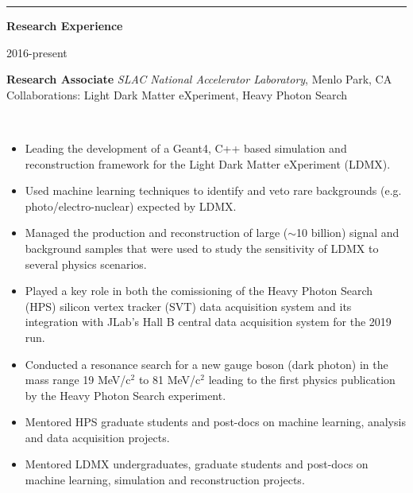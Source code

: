 \documentclass[11pt]{article}
\newcommand{\cvsection}[1] {
    \noindent
    \textcolor{indigodye}{\rule{.15\textwidth}{.1in} \hspace{0.01 \textwidth} \textbf{\Large{#1}}} \newline 
}
\newcommand{\experienceentrycollab}[6] { 
    \noindent
    \begin{minipage}[t]{0.15\textwidth} \begin{flushright} #1 \end{flushright} \end{minipage} \hspace{0.01\textwidth}
    \begin{minipage}[t]{0.84\textwidth} 
        \textbf{#2} \newline
        \emph{#3}, #4 \newline
        Collaborations: #5
    \end{minipage} \\[0.01pt]
    #6 \vspace{11pt}
}
\begin{document}
    \cvsection{Research Experience}
        \experienceentrycollab{2016-present}
                        {Research Associate}
                        {SLAC National Accelerator Laboratory}
                        {Menlo Park, CA}
                        {Light Dark Matter eXperiment, Heavy Photon Search}
                        {   
                            \begin{itemize}[label=\textcolor{indigodye}{$\circ$}, noitemsep, nolistsep, leftmargin=0.19\textwidth]
                                \item Leading the development of a Geant4, C++ based simulation and reconstruction 
                                      framework for the Light Dark Matter eXperiment (LDMX).
                                \item Used machine learning techniques to identify and veto rare backgrounds (e.g.
                                      photo/electro-nuclear) expected by LDMX.
                                \item Managed the production and reconstruction of large ($\sim$10 billion) signal and
                                      background samples that were used to study the sensitivity of LDMX to several 
                                      physics scenarios.
                                \item Played a key role in both the comissioning of the Heavy Photon Search 
                                      (HPS) silicon vertex tracker (SVT) data acquisition system and its integration
                                      with JLab's Hall B central data acquisition system for the 2019 run.
                                \item Conducted a resonance search for a new gauge boson (dark photon) in the mass range 
                                      19 MeV/c$^2$ to 81 MeV/c$^2$ leading to the first physics publication by the
                                      Heavy Photon Search experiment.
                                \item Mentored HPS graduate students and post-docs on machine learning, 
                                      analysis and data acquisition projects.
                                \item Mentored LDMX undergraduates, graduate students and post-docs on 
                                      machine learning, simulation and reconstruction projects.
                            \end{itemize} 
                        } 
\end{document}

